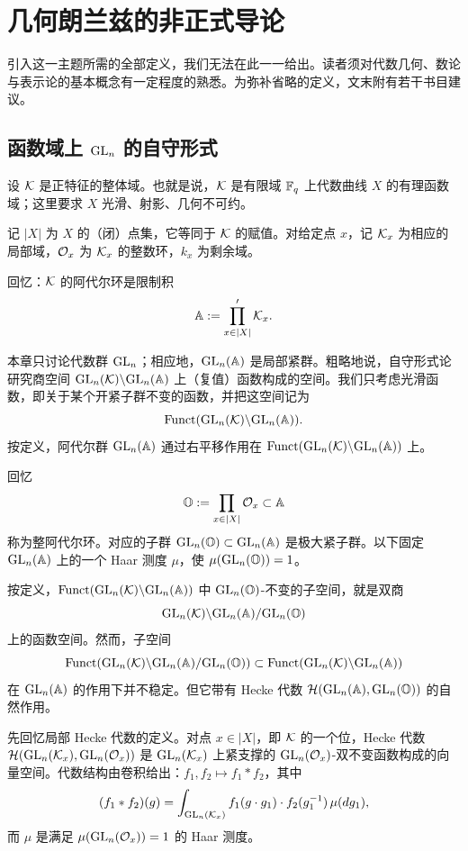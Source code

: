 \chapter*{几何朗兰兹的非正式导论}
\begingroup\let\thefootnote\relax{}\endgroup

引入这一主题所需的全部定义，我们无法在此一一给出。读者须对代数几何、数论与表示论的基本概念有一定程度的熟悉。为弥补省略的定义，文末附有若干书目建议。

\section{函数域上 $\GL_n$ 的自守形式}

设 $\cK$ 是正特征的整体域。也就是说，$\cK$ 是有限域 $\Fq$ 上代数曲线 $X$ 的有理函数域；这里要求 $X$ 光滑、射影、几何不可约。

记 $|X|$ 为 $X$ 的（闭）点集，它等同于 $\cK$ 的赋值。对给定点 $x$，记 $\cK_x$ 为相应的局部域，$\cO_x$ 为 $\cK_x$ 的整数环，$k_x$ 为剩余域。

回忆：$\cK$ 的阿代尔环是限制积
\[
\A:=\prod_{x\in|X|}'\cK_x .
\]

本章只讨论代数群 $\GL_n$；相应地，$\GL_n(\A)$ 是局部紧群。粗略地说，自守形式论研究商空间 $\GL_n(\cK)\backslash\GL_n(\A)$ 上（复值）函数构成的空间。我们只考虑光滑函数，即关于某个开紧子群不变的函数，并把这空间记为
\[
\Funct(\GL_n(\cK)\backslash\GL_n(\A)).
\]
按定义，阿代尔群 $\GL_n(\A)$ 通过右平移作用在 $\Funct(\GL_n(\cK)\backslash\GL_n(\A))$ 上。

回忆
\[
\sO:=\prod_{x\in|X|}\cO_x\subset\A
\]
称为整阿代尔环。对应的子群 $\GL_n(\sO)\subset\GL_n(\A)$ 是极大紧子群。以下固定 $\GL_n(\A)$ 上的一个 Haar 测度 $\mu$，使 $\mu(\GL_n(\sO))=1$。

按定义，$\Funct(\GL_n(\cK)\backslash\GL_n(\A))$ 中 $\GL_n(\sO)$-不变的子空间，就是双商
\[
\GL_n(\cK)\backslash\GL_n(\A)/\GL_n(\sO)
\]
上的函数空间。然而，子空间
\[
\Funct(\GL_n(\cK)\backslash\GL_n(\A)/\GL_n(\sO))\subset\Funct(\GL_n(\cK)\backslash\GL_n(\A))
\]
在 $\GL_n(\A)$ 的作用下并不稳定。但它带有 Hecke 代数 $\sH(\GL_n(\A),\GL_n(\sO))$ 的自然作用。

先回忆局部 Hecke 代数的定义。对点 $x\in|X|$，即 $\cK$ 的一个位，Hecke 代数 $\sH(\GL_n(\cK_x),\GL_n(\cO_x))$ 是 $\GL_n(\cK_x)$ 上紧支撑的 $\GL_n(\cO_x)$-双不变函数构成的向量空间。代数结构由卷积给出：$f_1,f_2\mapsto f_1*f_2$，其中
\[
(f_1*f_2)(g)=\int_{\GL_n(\cK_x)}f_1(g\cdot g_1)\cdot f_2(g_1^{-1})\,\mu(dg_1),
\]
而 $\mu$ 是满足 $\mu(\GL_n(\cO_x))=1$ 的 Haar 测度。

